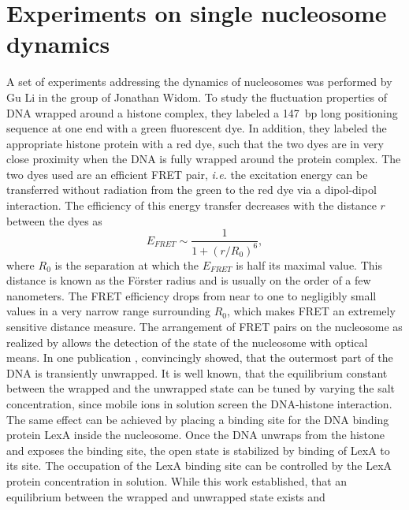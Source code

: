 \section{Experiments on single nucleosome dynamics}
A set of experiments addressing the dynamics of nucleosomes was performed by 
Gu Li in the group of Jonathan Widom. To study the fluctuation properties of DNA 
wrapped around a histone complex, they labeled a 147~bp long positioning sequence
at one end with a green fluorescent dye. 
In addition, they labeled the appropriate histone protein with a red dye, such that the two dyes
are in very close proximity when the DNA is fully wrapped around the protein complex. The two dyes used
are an efficient FRET pair, \emph{i.e.} the excitation energy can be transferred without radiation
from the green to the red dye via a dipol-dipol interaction. The efficiency of this energy transfer
decreases with the distance $r$ between the dyes as
\begin{equation}
\label{eq:FRET_efficiency}
E_{FRET}\sim \frac{1}{1+(r/R_0)^{6}},
\end{equation}
where $R_0$ is the separation at which the $E_{FRET}$ is half its maximal value. 
%
This distance is known as the F\"orster radius  and is usually on the order of a few nanometers. 
The FRET efficiency drops from near to one to negligibly small values in a
very narrow range surrounding $R_0$, which makes FRET an extremely sensitive distance measure.
The arrangement of FRET pairs on the nucleosome as realized by \citeauthor{Li_NatureStructMolBio_04}
allows the detection of the state of the nucleosome with optical means. 
In one publication \cite{Li_NatureStructMolBio_04}, \citeauthor{Li_NatureStructMolBio_04} convincingly showed, 
that the outermost part of the DNA is transiently unwrapped. It is well known, that the equilibrium constant
between the wrapped and the unwrapped state can be tuned by varying the salt concentration,
since mobile ions in solution screen the DNA-histone interaction. The same effect can be achieved
by placing a binding site for the DNA binding protein LexA inside the nucleosome. 
Once the DNA unwraps from the histone and exposes the binding site, the open 
state is stabilized by binding of LexA to its site. The occupation of the LexA binding site 
can be controlled by the LexA protein concentration in solution.
While this work established, that an equilibrium between the wrapped and unwrapped state exists and 
